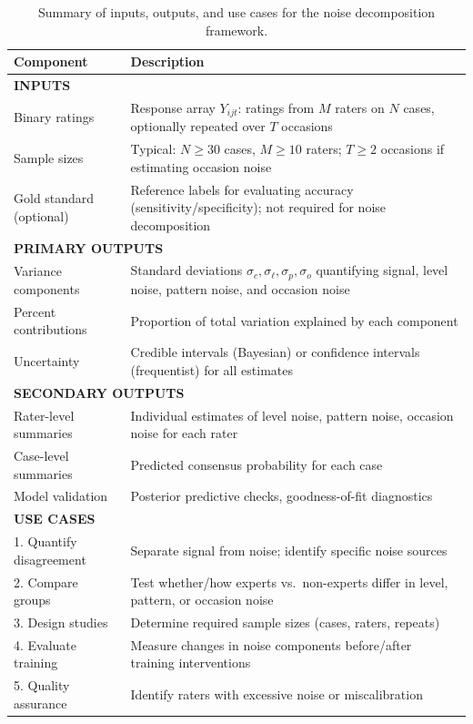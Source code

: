 \begin{table}[h!]
\centering
\small
\begin{tabular}{p{}p{}}
\toprule
\textbf{Component} & \textbf{Description} \\
\midrule
\multicolumn{2}{l}{\textbf{INPUTS}} \\
Binary ratings & Response array $Y_{ijt}$: ratings from $M$ raters on $N$ cases, optionally repeated over $T$ occasions \\
Sample sizes & Typical: $N \geq 30$ cases, $M \geq 10$ raters; $T \geq 2$ occasions if estimating occasion noise \\
Gold standard (optional) & Reference labels for evaluating accuracy (sensitivity/specificity); not required for noise decomposition \\
\midrule
\multicolumn{2}{l}{\textbf{PRIMARY OUTPUTS}} \\
Variance components & Standard deviations $\sigma_c, \sigma_\ell, \sigma_p, \sigma_o$ quantifying signal, level noise, pattern noise, and occasion noise \\
Percent contributions & Proportion of total variation explained by each component \\
Uncertainty & Credible intervals (Bayesian) or confidence intervals (frequentist) for all estimates \\
\midrule
\multicolumn{2}{l}{\textbf{SECONDARY OUTPUTS}} \\
Rater-level summaries & Individual estimates of level noise, pattern noise, occasion noise for each rater \\
Case-level summaries & Predicted consensus probability for each case \\
Model validation & Posterior predictive checks, goodness-of-fit diagnostics \\
\midrule
\multicolumn{2}{l}{\textbf{USE CASES}} \\
1. Quantify disagreement & Separate signal from noise; identify specific noise sources \\
2. Compare groups & Test whether/how experts vs.\ non-experts differ in level, pattern, or occasion noise \\
3. Design studies & Determine required sample sizes (cases, raters, repeats) \\
4. Evaluate training & Measure changes in noise components before/after training interventions \\
5. Quality assurance & Identify raters with excessive noise or miscalibration \\
\bottomrule
\end{tabular}
\caption{Summary of inputs, outputs, and use cases for the noise decomposition framework.}
\label{tab:overview}
\end{table}

